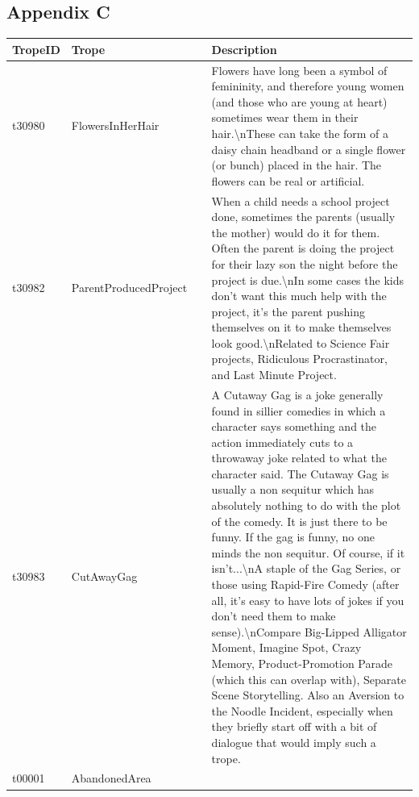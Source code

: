 \documentclass[11pt]{article}
\begin{document}
\subsection{Appendix C}
\begin{longtable}{p{0.1\linewidth} | p{0.35\linewidth} | p{0.55\linewidth}}
  \hline
  TropeID &
    Trope &
    Description \\ \hline
  \endfirsthead
  \endhead
  t30980 &
    FlowersInHerHair &
    Flowers have long been a symbol of femininity, and therefore young women (and those who are young at heart) sometimes wear them in their hair.\textbackslash{}nThese can take the form of a daisy chain headband or a single flower (or bunch) placed in the hair. The flowers can be real or artificial. \\ \hline
  t30982 &
    ParentProducedProject &
    When a child needs a school project done, sometimes the parents (usually the mother) would do it for them. Often the parent is doing the project for their lazy son the night before the project is due.\textbackslash{}nIn some cases the kids don't want this much help with the project, it's the parent pushing themselves on it to make themselves look good.\textbackslash{}nRelated to Science Fair projects, Ridiculous Procrastinator, and Last Minute Project. \\ \hline
  t30983 &
    CutAwayGag &
    A Cutaway Gag is a joke generally found in sillier comedies in which a character says something and the action immediately cuts to a throwaway joke related to what the character said. The Cutaway Gag is usually a non sequitur which has absolutely nothing to do with the plot of the comedy. It is just there to be funny. If the gag is funny, no one minds the non sequitur. Of course, if it isn't...\textbackslash{}nA staple of the Gag Series, or those using Rapid-Fire Comedy (after all, it's easy to have lots of jokes if you don't need them to make sense).\textbackslash{}nCompare Big-Lipped Alligator Moment, Imagine Spot, Crazy Memory, Product-Promotion Parade (which this can overlap with), Separate Scene Storytelling. Also an Aversion to the Noodle Incident, especially when they briefly start off with a bit of dialogue that would imply such a trope. \\ \hline
  t00001 &
    AbandonedArea &

\end{longtable}
\end{document}
